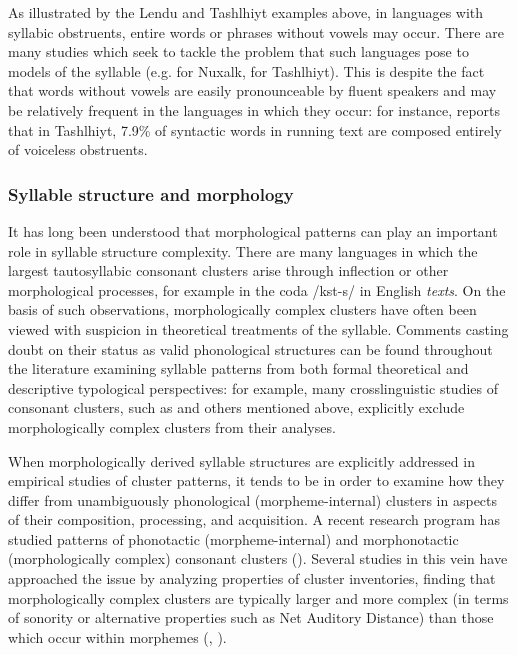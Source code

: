   As illustrated by the Lendu and Tashlhiyt examples above, in languages with syllabic obstruents, entire words or phrases without vowels may occur. There are many studies which seek to tackle the problem that such languages pose to models of the syllable (e.g. \citealt{Bagemihl1991} for Nuxalk, \citealt{Coleman2001} for Tashlhiyt). This is despite the fact that words without vowels are easily pronounceable by fluent speakers and may be relatively frequent in the languages in which they occur: for instance, \citet[328f]{Ridouane2008} reports that in Tashlhiyt, 7.9\% of syntactic words in running text are composed entirely of voiceless obstruents. 

\subsubsection{{Syllable} {structure} {and} {morphology}}\label{sec:1.1.2.5}

  It has long been understood that morphological patterns can play an important role in syllable structure complexity. There are many languages in which the largest tautosyllabic consonant clusters arise through inflection or other morphological processes, for example in the coda /kst-s/ in English \textit{texts}. On the basis of such observations, morphologically complex clusters have often been viewed with suspicion in theoretical treatments of the syllable. Comments casting doubt on their status as valid phonological structures can be found throughout the literature examining syllable patterns from both formal theoretical and descriptive typological perspectives: for example, many crosslinguistic studies of consonant clusters, such as \citet{Greenberg19651978} and others mentioned above, explicitly exclude morphologically complex clusters from their analyses. 

  When morphologically derived syllable structures are explicitly addressed in empirical studies of cluster patterns, it tends to be in order to examine how they differ from unambiguously phonological (morpheme-internal) clusters in aspects of their composition, processing, and acquisition. A recent research program has studied patterns of phonotactic (morpheme-internal) and morphonotactic (morphologically complex) consonant clusters (\citealt{DresslerDziubalska-Kołaczyk2006}). Several studies in this vein have approached the issue by analyzing properties of cluster inventories, finding that morphologically complex clusters are typically larger and more complex (in terms of sonority or alternative properties such as Net Auditory Distance) than those which occur within morphemes (\citealt{DresslerDziubalska-Kołaczyk2006}, \citealt{Orzechowska2012}). 

